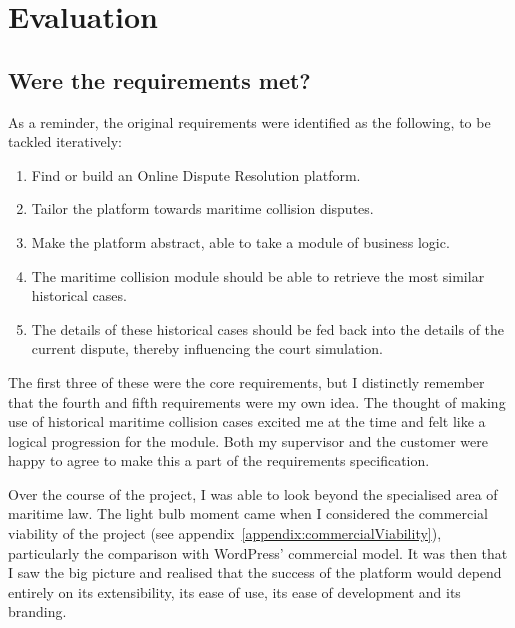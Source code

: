 \chapter{Evaluation}\label{chapter:evaluation}

\section{Were the requirements met?}

As a reminder, the original requirements were identified as the following, to be tackled iteratively:

\begin{enumerate}

    \item Find or build an Online Dispute Resolution platform.

    \item Tailor the platform towards maritime collision disputes.

    \item Make the platform abstract, able to take a module of business logic.

    \item The maritime collision module should be able to retrieve the most similar historical cases.

    \item The details of these historical cases should be fed back into the details of the current dispute, thereby influencing the court simulation.

\end{enumerate}

The first three of these were the core requirements, but I distinctly remember that the fourth and fifth requirements were my own idea. The thought of making use of historical maritime collision cases excited me at the time and felt like a logical progression for the module. Both my supervisor and the customer were happy to agree to make this a part of the requirements specification.

Over the course of the project, I was able to look beyond the specialised area of maritime law. The light bulb moment came when I considered the commercial viability of the project (see appendix~\ref{appendix:commercialViability}), particularly the comparison with WordPress' commercial model. It was then that I saw the big picture and realised that the success of the platform would depend entirely on its extensibility, its ease of use, its ease of development and its branding.

